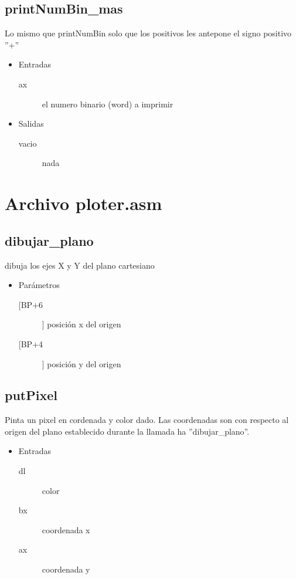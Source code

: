 \subsection{printNumBin\_mas}
\label{sec-2-7}
Lo mismo que printNumBin solo que los positivos les antepone el signo
positivo ''+''
\begin{itemize}
\item Entradas
\begin{description}
\item[ax] el numero binario (word) a imprimir
\end{description}
\item Salidas
\begin{description}
\item[vacio] nada
\end{description}
\end{itemize}


\section{Archivo ploter.asm}
\label{sec-3}

\subsection{dibujar\_plano}
\label{sec-3-1}
dibuja los ejes X y Y del plano cartesiano
\begin{itemize}
\item Parámetros
\begin{description}
\item[[BP+6]] posición x del origen
\item[[BP+4]] posición y del origen
\end{description}
\end{itemize}

\subsection{putPixel}
\label{sec-3-2}
Pinta un pixel en cordenada y color dado. Las coordenadas
son con respecto al origen del plano establecido durante la
llamada ha ''dibujar\_plano''.
\begin{itemize}
\item Entradas
\begin{description}
\item[dl] color
\item[bx] coordenada x
\item[ax] coordenada y
\end{description}
\end{itemize}

